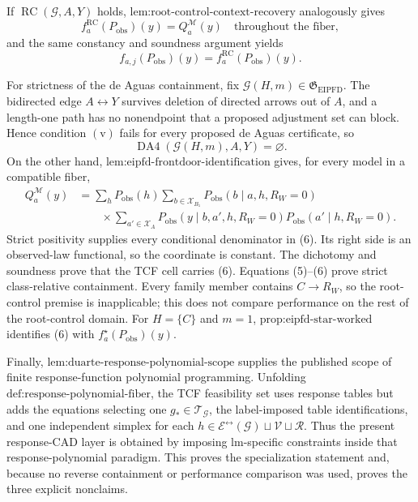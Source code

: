 If \(\operatorname{RC}(\mathcal G,A,Y)\) holds, \(\text{lem:root-control-context-recovery}\) analogously gives
\[
f_a^{\mathrm{RC}}(P_{\mathrm{obs}})(y)
=Q_a^{\mathcal M}(y)
\quad\text{throughout the fiber},
\tag{3}
\]
and the same constancy and soundness argument yields
\[
f_{a,j}(P_{\mathrm{obs}})(y)=f_a^{\mathrm{RC}}(P_{\mathrm{obs}})(y).
\tag{4}
\]

For strictness of the de Aguas containment, fix \(\mathcal G(H,m)\in\mathfrak G_{\mathrm{EIPFD}}\). The bidirected edge \(A\leftrightarrow Y\) survives deletion of directed arrows out of \(A\), and a length-one path has no nonendpoint that a proposed adjustment set can block. Hence condition \(\mathrm{(v)}\) fails for every proposed de Aguas certificate, so
\[
\operatorname{DA4}(\mathcal G(H,m),A,Y)=\varnothing.
\tag{5}
\]
On the other hand, \(\text{lem:eipfd-frontdoor-identification}\) gives, for every model in a compatible fiber,
\[
\begin{aligned}
Q_a^{\mathcal M}(y)
&=\sum_hP_{\mathrm{obs}}(h)
\sum_{b\in\mathcal X_{B_1}}P_{\mathrm{obs}}(b\mid a,h,R_W=0)\\
&\qquad\times\sum_{a'\in\mathcal X_A}
P_{\mathrm{obs}}(y\mid b,a',h,R_W=0)
P_{\mathrm{obs}}(a'\mid h,R_W=0).
\end{aligned}
\tag{6}
\]
Strict positivity supplies every conditional denominator in (6). Its right side is an observed-law functional, so the coordinate is constant. The dichotomy and soundness prove that the TCF cell carries (6). Equations (5)--(6) prove strict class-relative containment. Every family member contains \(C\to R_W\), so the root-control premise is inapplicable; this does not compare performance on the rest of the root-control domain. For \(H=\{C\}\) and \(m=1\), \(\text{prop:eipfd-star-worked}\) identifies (6) with \(f_a^\star(P_{\mathrm{obs}})(y)\).

Finally, \(\text{lem:duarte-response-polynomial-scope}\) supplies the published scope of finite response-function polynomial programming. Unfolding \(\text{def:response-polynomial-fiber}\), the TCF feasibility set uses response tables but adds the equations selecting one \(g_*\in\mathcal T_{\mathcal G}\), the label-imposed table identifications, and one independent simplex for each \(h\in\mathcal E^{\leftrightarrow}(\mathcal G)\sqcup\mathcal V\sqcup\mathcal R\). Thus the present response-CAD layer is obtained by imposing lm-specific constraints inside that response-polynomial paradigm. This proves the specialization statement and, because no reverse containment or performance comparison was used, proves the three explicit nonclaims.
